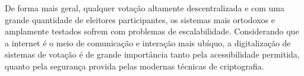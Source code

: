 De forma mais geral, qualquer votação altamente descentralizada e com uma grande quantidade de eleitores participantes, os sistemas mais ortodoxos e amplamente testados sofrem com problemas de escalabilidade. Considerando que a internet é o meio de comunicação e interação mais ubíquo, a digitalização de sistemas de votação é de grande importância tanto pela acessibilidade permitida, quanto pela segurança provida pelas modernas técnicas de criptografia.